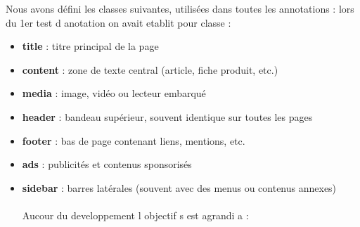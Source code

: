 \documentclass[12pt,a4paper]{report}
\begin{document}
Nous avons défini les classes suivantes, utilisées dans toutes les annotations :
lors du 1er test d anotation on avait etablit pour classe : 
\begin{itemize}
\item \textbf{title} : titre principal de la page
\item \textbf{content} : zone de texte central (article, fiche produit, etc.)
\item \textbf{media} : image, vidéo ou lecteur embarqué
\item \textbf{header} : bandeau supérieur, souvent identique sur toutes les pages
\item \textbf{footer} : bas de page contenant liens, mentions, etc.
\item \textbf{ads} : publicités et contenus sponsorisés
\item \textbf{sidebar} : barres latérales (souvent avec des menus ou contenus annexes) \\  \\ 


Aucour du developpement l objectif s est agrandi a : \\ \\



\end{itemize}
\end{document}
